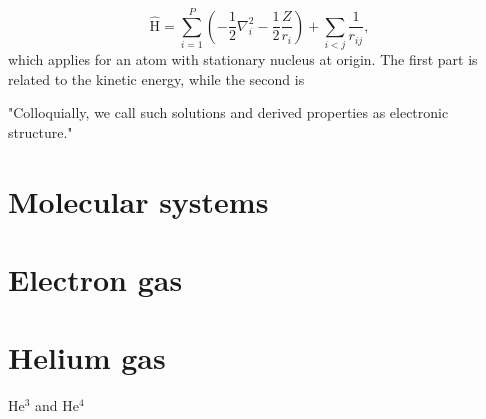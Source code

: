 \begin{equation}
\label{eq:AtomicHamiltonian}
\hat{\text{H}} = \sum_{i=1}^{P} (-\frac{1}{2} \nabla_i^2 - \frac{1}{2} \frac{Z}{r_i}) + \sum_{i<j} \frac{1}{r_{ij}},
\end{equation}
which applies for an atom with stationary nucleus at origin. The first part is related to the kinetic energy, while the second is 

"Colloquially, we call such solutions and derived properties as electronic structure."

\section{Molecular systems}

\section{Electron gas} \label{subsubsec:electrongas}
\section{Helium gas} \label{subsubsec:heliumgas}
He$^3$ and He$^4$